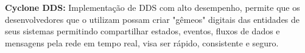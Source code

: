 \textbf{Cyclone DDS:} Implementação de DDS com alto desempenho, permite que os desenvolvedores que o utilizam possam criar "gêmeos" digitais das entidades de seus sistemas permitindo compartilhar estados, eventos, fluxos de dados e mensagens pela rede em tempo real, visa ser rápido, consistente e seguro.




